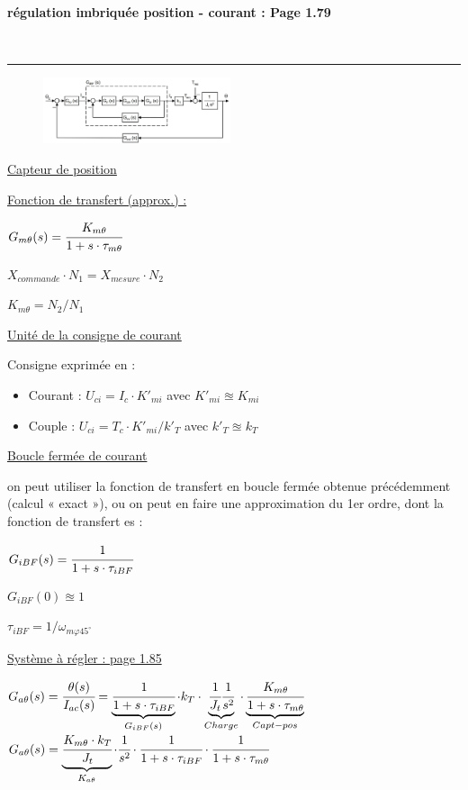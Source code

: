 \documentclass[	DIV=calc,%
							paper=a4,%
							fontsize=10pt,%
							twocolumn]{scrartcl} %
\newcounter{mycounter}
\newcommand{\formdesc}[1]{\large\textbf{#1} \addtocounter{mycounter}{1} \hfill \themycounter \\ \vspace{-3mm} \hrule \vspace{2mm}}
\newcommand{\formtitle}[1]{\large\underline{#1}}
\begin{document}
\formdesc{régulation imbriquée position - courant : Page 1.79}
\begin{figure}[H]
    \begin{center}
        \includegraphics[width = 0.49\textwidth]{img/Regulation_courrant_pos.JPG}
    \end{center}
\end{figure}

\formtitle{Capteur de position}

\underline{Fonction de transfert  (approx.) :}

\vspace{3mm}
$G_{m\theta}(s) = \cfrac{K_{m\theta}}{1+s\cdot\tau_{m\theta}} $

$X_{commande} \cdot N_1 = X_{mesure} \cdot N_2$

$K_{m\theta} = N_2/N_1$

\underline{Unité de la consigne de courant}

Consigne exprimée en : 
\begin{itemize}
    \item Courant : $U_{ci} = I_c \cdot K'_{mi}$ avec $K'_{mi} \approxeq K_{mi}$
    \item Couple  : $U_{ci} = T_c \cdot K'_{mi}/k'_T$ avec $k'_T \approxeq k _T$
\end{itemize}


\underline{Boucle fermée de courant}

on peut utiliser la fonction de transfert en boucle fermée obtenue 
précédemment (calcul « exact »), ou on peut en faire une approximation du 1er ordre, dont la fonction de 
transfert es :

$G_{iBF}(s) = \cfrac{1}{1+s\cdot\tau_{iBF}} $

$G_{iBF}(0) \approxeq 1$

 $\tau_{iBF} = 1/ \omega_{m\varphi 45^\circ}$ 

\underline{Système à régler : page 1.85}

$G_{a\theta}(s) = \cfrac{\theta(s)}{I_{ac}(s)} = \underbrace{\cfrac{1}{1+s\cdot\tau_{iBF}}}_{G_{iBF}(s)}\cdot k_T \cdot \underbrace{\cfrac{1}{J_t}\cfrac{1}{s^2}}_{Charge} \cdot \underbrace{\cfrac{K_{m\theta}}{1+s\cdot\tau_{m\theta}}}_{Capt-pos} $ 
$G_{a\theta}(s) = \underbrace{\cfrac{K_{m\theta} \cdot k_T}{J_t}}_{K_{a\theta} }\cdot \cfrac{1}{s^2}\cdot \cfrac{1}{1+s\cdot\tau_{iBF}} \cdot \cfrac{1}{1+s\cdot\tau_{m\theta}}$
\end{document}
